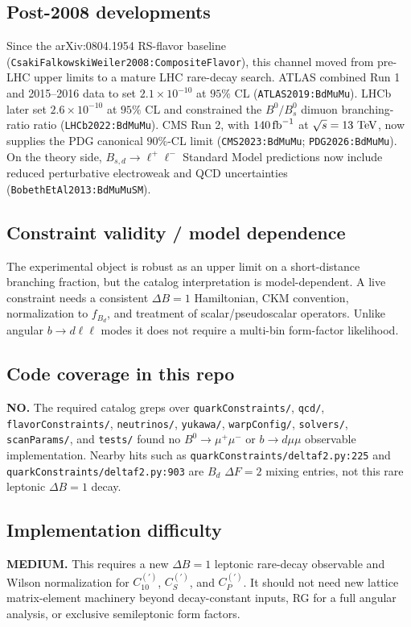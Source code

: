 \subsection*{Post-2008 developments}
Since the arXiv:0804.1954 RS-flavor baseline
(\texttt{CsakiFalkowskiWeiler2008:CompositeFlavor}), this channel moved from
pre-LHC upper limits to a mature LHC rare-decay search.  ATLAS combined Run 1
and 2015--2016 data to set \(2.1\times10^{-10}\) at \(95\%\) CL
(\texttt{ATLAS2019:BdMuMu}).  LHCb later set \(2.6\times10^{-10}\) at
\(95\%\) CL and constrained the \(B^0/B_s^0\) dimuon branching-ratio ratio
(\texttt{LHCb2022:BdMuMu}).  CMS Run 2, with \(140\,{\rm fb}^{-1}\) at
\(\sqrt{s}=13~{\rm TeV}\), now supplies the PDG canonical \(90\%\)-CL limit
(\texttt{CMS2023:BdMuMu}; \texttt{PDG2026:BdMuMu}).  On the theory side,
\(B_{s,d}\to\ell^+\ell^-\) Standard Model predictions now include reduced
perturbative electroweak and QCD uncertainties
(\texttt{BobethEtAl2013:BdMuMuSM}).

\subsection*{Constraint validity / model dependence}
The experimental object is robust as an upper limit on a short-distance
branching fraction, but the catalog interpretation is model-dependent.  A live
constraint needs a consistent \(\Delta B=1\) Hamiltonian, CKM convention,
normalization to \(f_{B_d}\), and treatment of scalar/pseudoscalar operators.
Unlike angular \(b\to d\ell\ell\) modes it does not require a multi-bin
form-factor likelihood.

\subsection*{Code coverage in this repo}
\textbf{NO.}  The required catalog greps over \texttt{quarkConstraints/},
\texttt{qcd/}, \texttt{flavorConstraints/}, \texttt{neutrinos/},
\texttt{yukawa/}, \texttt{warpConfig/}, \texttt{solvers/},
\texttt{scanParams/}, and \texttt{tests/} found no \(B^0\to\mu^+\mu^-\) or
\(b\to d\mu\mu\) observable implementation.  Nearby hits such as
\texttt{quarkConstraints/deltaf2.py:225} and
\texttt{quarkConstraints/deltaf2.py:903} are \(B_d\) \(\Delta F=2\) mixing
entries, not this rare leptonic \(\Delta B=1\) decay.

\subsection*{Implementation difficulty}
\textbf{MEDIUM.}  This requires a new \(\Delta B=1\) leptonic rare-decay
observable and Wilson normalization for \(C_{10}^{(\prime)}\),
\(C_S^{(\prime)}\), and \(C_P^{(\prime)}\).  It should not need new lattice
matrix-element machinery beyond decay-constant inputs, RG for a full angular
analysis, or exclusive semileptonic form factors.

